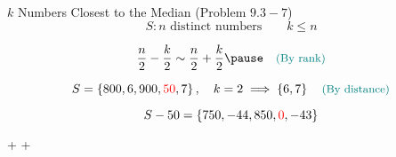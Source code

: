 \begin{frame}{}
  \begin{exampleblock}{$k$ Numbers Closest to the Median (Problem $9.3-7$)}
    \[
      S: n \text{ distinct numbers} \qquad k \le n
    \]
  \end{exampleblock}

  \pause
  \[
    \frac{n}{2} - \frac{k}{2} \sim \frac{n}{2} + \frac{k}{2} \pause \quad \text{\small \teal{(By rank)}}
  \]

  \pause
  \[
    S = \left\{800, 6, 900, \textcolor{red}{50}, 7\right\}, \quad k = 2 \implies \left\{6,7\right\} \quad \text{\small \textcolor{teal}{(By distance)}}
  \]

  \pause
  \[
    S - 50 = \left\{750, -44, 850, \textcolor{red}{0}, -43\right\}
  \]

  \pause
  \vspace{0.50cm}
  \centerline{ +  + }
\end{frame}
